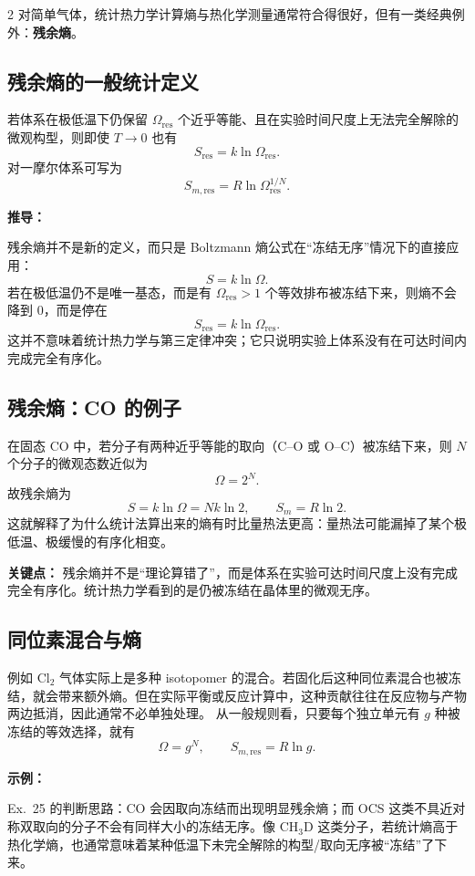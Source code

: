 \documentclass[a4paper,9pt]{article}
\newenvironment{keypoint}
{\par\vspace{0.3em}\noindent\begin{tcolorbox}[colback=keybg,colframe=keycolor,boxrule=0.5pt,arc=2pt,left=2pt,right=2pt,top=2pt,bottom=2pt,boxsep=0pt]\noindent\textcolor{keycolor}{\textbf{关键点：}}}
{\end{tcolorbox}\par\vspace{0.3em}}
\newenvironment{derivation}
{\par\vspace{0.3em}\noindent\begin{tcolorbox}[colback=boxbg,colframe=derivcolor,boxrule=0.5pt,arc=2pt,left=2pt,right=2pt,top=2pt,bottom=2pt,boxsep=0pt]\scriptsize\noindent\textcolor{derivcolor}{\textbf{推导：}}\par}
{\end{tcolorbox}\par\vspace{0.3em}}
\newenvironment{examplebox}
{\par\vspace{0.3em}\noindent\begin{tcolorbox}[colback=boxbg,colframe=derivcolor,boxrule=0.5pt,arc=2pt,left=2pt,right=2pt,top=2pt,bottom=2pt,boxsep=0pt]\scriptsize\noindent\textcolor{derivcolor}{\textbf{示例：}}\par\setlength{\parskip}{0.1ex}\setlength{\itemsep}{0pt}\setlength{\parsep}{0pt}}
{\end{tcolorbox}\par\vspace{0.3em}}
\begin{document}
\begin{multicols}{2}
	对简单气体，统计热力学计算熵与热化学测量通常符合得很好，但有一类经典例外：\textbf{残余熵}。

	\subsection{残余熵的一般统计定义}
	若体系在极低温下仍保留 $\Omega_{\mathrm{res}}$ 个近乎等能、且在实验时间尺度上无法完全解除的微观构型，则即使 $T\to 0$ 也有
	\[
		S_{\mathrm{res}}=k\ln \Omega_{\mathrm{res}}.
	\]
	对一摩尔体系可写为
	\[
		S_{m,\mathrm{res}}=R\ln \Omega_{\mathrm{res}}^{1/N}.
	\]

	\begin{derivation}
		残余熵并不是新的定义，而只是 Boltzmann 熵公式在“冻结无序”情况下的直接应用：
		\[
			S=k\ln\Omega.
		\]
		若在极低温仍不是唯一基态，而是有 $\Omega_{\mathrm{res}}>1$ 个等效排布被冻结下来，则熵不会降到 0，而是停在
		\[
			S_{\mathrm{res}}=k\ln\Omega_{\mathrm{res}}.
		\]
		这并不意味着统计热力学与第三定律冲突；它只说明实验上体系没有在可达时间内完成完全有序化。
	\end{derivation}

	\subsection{残余熵：CO 的例子}
	在固态 CO 中，若分子有两种近乎等能的取向（C--O 或 O--C）被冻结下来，则 $N$ 个分子的微观态数近似为
	\[
		\Omega=2^N.
	\]
	故残余熵为
	\[
		S=k\ln\Omega=Nk\ln 2,
		\qquad
		S_m=R\ln 2.
	\]
	这就解释了为什么统计法算出来的熵有时比量热法更高：量热法可能漏掉了某个极低温、极缓慢的有序化相变。

	\begin{keypoint}
		残余熵并不是“理论算错了”，而是体系在实验可达时间尺度上没有完成完全有序化。统计热力学看到的是仍被冻结在晶体里的微观无序。
	\end{keypoint}

	\subsection{同位素混合与熵}
	例如 Cl$_2$ 气体实际上是多种 isotopomer 的混合。若固化后这种同位素混合也被冻结，就会带来额外熵。但在实际平衡或反应计算中，这种贡献往往在反应物与产物两边抵消，因此通常不必单独处理。
	从一般规则看，只要每个独立单元有 $g$ 种被冻结的等效选择，就有
	\[
		\Omega=g^N,
		\qquad
		S_{m,\mathrm{res}}=R\ln g.
	\]

	\begin{examplebox}
		Ex.~25 的判断思路：CO 会因取向冻结而出现明显残余熵；而 OCS 这类不具近对称双取向的分子不会有同样大小的冻结无序。像 CH$_3$D 这类分子，若统计熵高于热化学熵，也通常意味着某种低温下未完全解除的构型/取向无序被“冻结”了下来。
	\end{examplebox}


\end{multicols}
\end{document}
